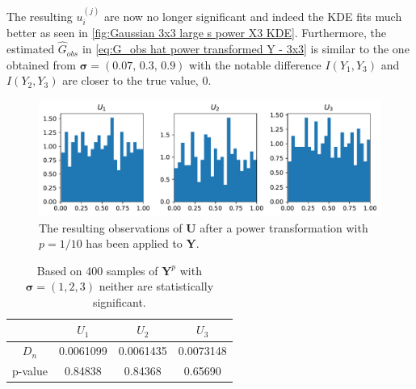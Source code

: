 \documentclass[../Thesis.tex]{subfiles}
\begin{document}



The resulting $u_i^{(j)}$ are now no longer significant and indeed the KDE fits much better as seen in \autoref{fig:Gaussian 3x3 large s power X3 KDE}. Furthermore, the estimated $\hat{G}_{obs}$ in \autoref{eq:G_obs hat power transformed Y - 3x3} is similar to the one obtained from $\boldsymbol \sigma = \left(0.07,\, 0.3,\, 0.9\right)$ with the notable difference $I(Y_1,Y_3)$ and $I(Y_2,Y_3)$ are closer to the true value, $0$.
\begin{figure}[ht]
    \centering
    \includegraphics[width=0.99\linewidth]{figures/ND examples/Gaussian 3x3 large s power uniforms.pdf}
    \caption{The resulting observations of $\boldsymbol U$ after a power transformation with $p = 1/10$ has been applied to $\boldsymbol Y$.}
    \label{fig:Gaussian 3x3 large s power uniforms}
\end{figure}
\begin{table}[ht]
    \centering
    \begin{tabular}{c|c|c|c}
                & $U_1$     & $U_2$     & $U_3$     \\\hline
        $D_n$   & 0.0061099 & 0.0061435 & 0.0073148 \\
        p-value & 0.84838   & 0.84368   & 0.65690
    \end{tabular}
    \caption{Based on 400 samples of $\boldsymbol Y^p $ with $\boldsymbol\sigma = (1, 2, 3)$ neither are statistically significant.}
    \label{tab:Results - 3x3 case - large s KS test - transformed}
\end{table}
\end{document}
